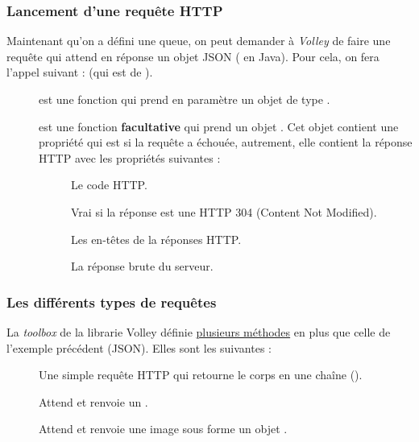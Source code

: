 \subsubsection{Lancement d'une requête HTTP}
Maintenant qu'on a défini une queue, on peut demander à \emph{Volley} de faire une requête qui attend en réponse un objet JSON ( en Java). Pour cela, on fera l'appel suivant :  (qui est de ).

\begin{description}
    \item[] est une fonction qui prend en paramètre un objet de type .
    \item[] est une fonction \textbf{facultative} qui prend un objet . Cet objet contient une propriété  qui est  si la requête a échouée, autrement, elle contient la réponse HTTP avec les propriétés suivantes :
        \begin{description}
            \item[] Le code HTTP.
            \item[] Vrai si la réponse est une HTTP 304 (Content Not Modified).
            \item[] Les en-têtes de la réponses HTTP.
            \item[] La réponse brute du serveur.
        \end{description}
\end{description}

\subsubsection{Les différents types de requêtes}
La \emph{toolbox} de la librarie Volley définie \href{https://afzaln.com/volley/com/android/volley/toolbox/package-tree.html}{plusieurs méthodes} en plus que celle de l'exemple précédent (JSON). Elles sont les suivantes :

\begin{description}
    \item[] Une simple requête HTTP qui retourne le corps en une chaîne ().
    \item[] Attend et renvoie un .
    \item[] Attend et renvoie une image sous forme un objet .
\end{description}

